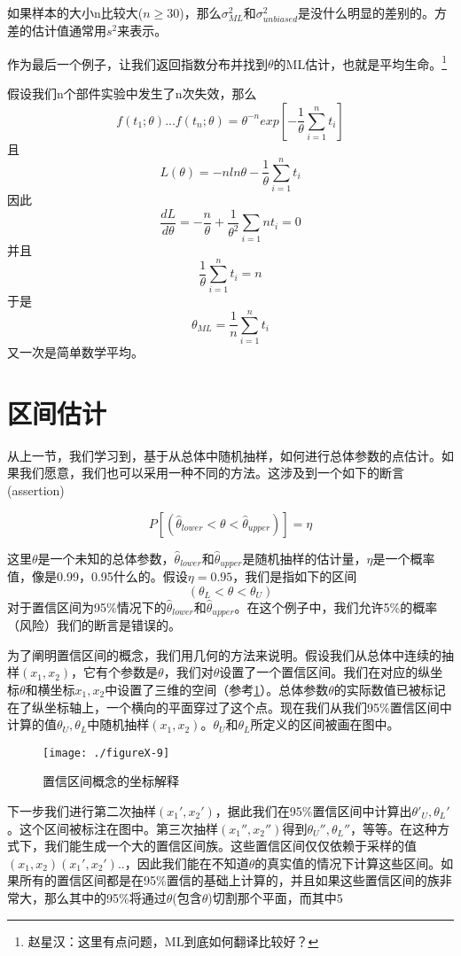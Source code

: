 \documentclass[cn,11pt,chinese]{elegantbook}
\begin{document}
{如果样本的大小n比较大($n\geq 30$)，那么$\sigma^2_{ML}$和$\sigma^2_{unbiased}$是没什么明显的差别的。方差的估计值通常用$s^2$来表示。

作为最后一个例子，让我们返回指数分布并找到$\theta$的ML估计，也就是平均生命。\footnote{赵星汉：这里有点问题，ML到底如何翻译比较好？}

假设我们n个部件实验中发生了n次失效，那么
$$f(t_1;\theta)...f(t_n;\theta)=\theta^{-n}exp[-\frac{1}{\theta}\sum_{i=1}^{n}t_i]$$
且
$$L(\theta)=-nln\theta - \frac{1}{\theta}\sum_{i=1}^{n}t_i$$
因此
$$\frac{dL}{d\theta} = -\frac{n}{\theta}+\frac{1}{\theta^2}\sum_{i=1}{n}t_i=0$$
并且
$$\frac{1}{\theta}\sum_{i=1}^{n}t_i=n$$
于是
$$\theta_{ML}=\frac{1}{n}\sum_{i=1}^n t_i$$
又一次是简单数学平均。

\section{区间估计}

从上一节，我们学习到，基于从总体中随机抽样，如何进行总体参数的点估计。如果我们愿意，我们也可以采用一种不同的方法。这涉及到一个如下的断言(assertion)

$$P[(\hat{\theta}_{lower} < \theta < \hat{\theta}_{upper})] = \eta$$

这里$\theta$是一个未知的总体参数，$\hat{\theta}_{lower}$和$\hat{\theta}_{upper}$是随机抽样的估计量，$\eta$是一个概率值，像是0.99，0.95什么的。假设$\eta=0.95$，我们是指如下的区间
$$(\theta_L<\theta<\theta_U)$$
对于置信区间为95\%情况下的$\hat{\theta}_{lower}$和$\hat{\theta}_{upper}$。在这个例子中，我们允许5\%的概率（风险）我们的断言是错误的。

为了阐明置信区间的概念，我们用几何的方法来说明。假设我们从总体中连续的抽样$(x_1,x_2)$，它有个参数是$\theta$，我们对$\theta$设置了一个置信区间。我们在对应的纵坐标$\theta$和横坐标$x_1,x_2$中设置了三维的空间（参考\ref{fig10-9}）。总体参数$\theta$的实际数值已被标记在了纵坐标轴上，一个横向的平面穿过了这个点。现在我们从我们95\%置信区间中计算的值$\theta_U,\theta_L$中随机抽样$(x_1,x_2)$。$\theta_U$和$\theta_L$所定义的区间被画在图中。

\begin{figure}
	\texttt{[image: ./figureX-9]}
	\caption{置信区间概念的坐标解释}
	\label{fig10-9}
\end{figure}

下一步我们进行第二次抽样$(x_1',x_2')$，据此我们在95\%置信区间中计算出$\theta '_U,\theta_L'$。这个区间被标注在图中。第三次抽样$(x_1'',x_2'')$得到$\theta_U'',\theta_L ''$，等等。在这种方式下，我们能生成一个大的置信区间族。这些置信区间仅仅依赖于采样的值$(x_1,x_2)(x_1',x_2')..$，因此我们能在不知道$\theta$的真实值的情况下计算这些区间。如果所有的置信区间都是在95\%置信的基础上计算的，并且如果这些置信区间的族非常大，那么其中的95\%将通过$\theta$(包含$\theta$)切割那个平面，而其中5%

}
\end{document}
